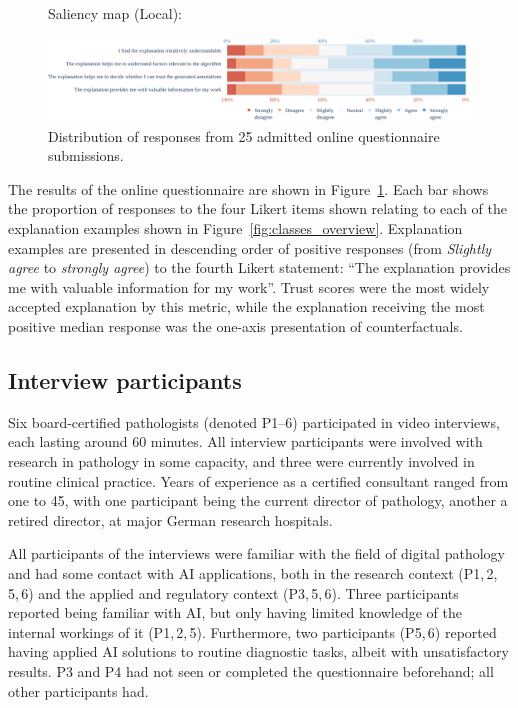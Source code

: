 \documentclass[final,5p,times,twocolumn,hyphens]{elsarticle}
\begin{document}
\begin{figure}
\begin{minipage}[c]{0.9\textwidth}
    Saliency map (Local):
    
    \includegraphics[width=\linewidth]{main/Graphics/4ResultsandAnalysis/6_SaliencyMapLocal.png}
    \caption{Distribution of responses from 25 admitted online questionnaire submissions.}
\label{fig:results}
\end{minipage}
\end{figure}

The results of the online questionnaire are shown in Figure~\ref{fig:results}. Each bar shows the proportion of responses to the four Likert items shown relating to each of the explanation examples shown in Figure~\ref{fig:classes_overview}. Explanation examples are presented in descending order of positive responses (from \textit{Slightly agree} to \textit{strongly agree}) to the fourth Likert statement: ``The explanation provides me with valuable information for my work''. Trust scores were the most widely accepted explanation by this metric, while the explanation receiving the most positive median response was the one-axis presentation of counterfactuals.

\subsection{Interview participants}

Six board-certified pathologists (denoted P1--6) participated in video interviews, each lasting around 60 minutes. All interview participants were involved with research in pathology in some capacity, and three were currently involved in routine clinical practice. Years of experience as a certified consultant ranged from one to 45, with one participant being the current director of pathology, another a retired director, at major German research hospitals.

All participants of the interviews were familiar with the field of digital pathology and had some contact with AI applications, both in the research context (P1,\,2,\,5,\,6) and the applied and regulatory context (P3,\,5,\,6). Three participants reported being familiar with AI, but only having limited knowledge of the internal workings of it (P1,\,2,\,5). Furthermore, two participants (P5,\,6) reported having applied AI solutions to routine diagnostic tasks, albeit with unsatisfactory results. P3 and P4 had not seen or completed the questionnaire beforehand; all other participants had.
\end{document}
